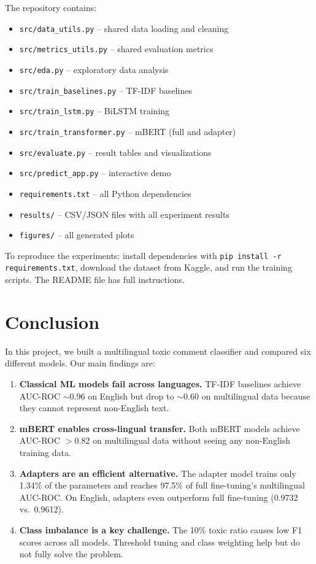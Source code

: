 \documentclass[11pt,a4paper]{article}
\begin{document}
The repository contains:
\begin{itemize}  \item \texttt{src/data\_utils.py} -- shared data loading and cleaning
  \item \texttt{src/metrics\_utils.py} -- shared evaluation metrics
  \item \texttt{src/eda.py} -- exploratory data analysis
  \item \texttt{src/train\_baselines.py} -- TF-IDF baselines
  \item \texttt{src/train\_lstm.py} -- BiLSTM training
  \item \texttt{src/train\_transformer.py} -- mBERT (full and adapter)
  \item \texttt{src/evaluate.py} -- result tables and visualizations
  \item \texttt{src/predict\_app.py} -- interactive demo
  \item \texttt{requirements.txt} -- all Python dependencies
  \item \texttt{results/} -- CSV/JSON files with all experiment results
  \item \texttt{figures/} -- all generated plots
\end{itemize}

To reproduce the experiments: install dependencies with
\texttt{pip install -r requirements.txt}, download the dataset from Kaggle, and
run the training scripts. The README file has full instructions.

\section{Conclusion}

In this project, we built a multilingual toxic comment classifier and compared
six different models. Our main findings are:

\begin{enumerate}  \item \textbf{Classical ML models fail across languages.} TF-IDF baselines
        achieve AUC-ROC $\sim$0.96 on English but drop to $\sim$0.60 on
        multilingual data because they cannot represent non-English text.
  \item \textbf{mBERT enables cross-lingual transfer.} Both mBERT models
        achieve AUC-ROC $>$0.82 on multilingual data without seeing any
        non-English training data.
  \item \textbf{Adapters are an efficient alternative.} The adapter model trains
        only 1.34\% of the parameters and reaches 97.5\% of full fine-tuning's
        multilingual AUC-ROC. On English, adapters even outperform full
        fine-tuning (0.9732 vs.\ 0.9612).
  \item \textbf{Class imbalance is a key challenge.} The 10\% toxic ratio
        causes low F1 scores across all models. Threshold tuning and class
        weighting help but do not fully solve the problem.
\end{enumerate}
\end{document}
